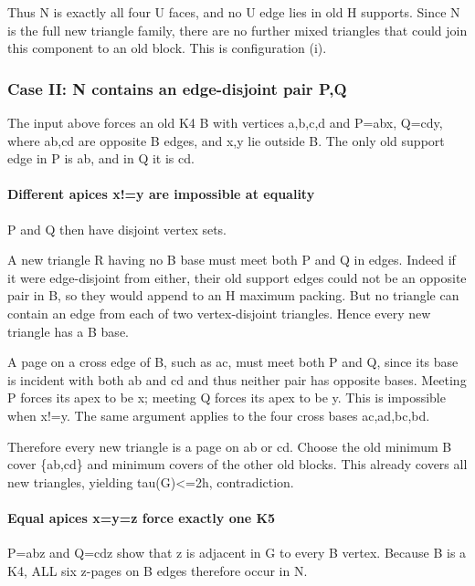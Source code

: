 \documentclass[11pt]{article}
\begin{document}
Thus N is exactly all four U faces, and no U edge lies in old H supports. Since N is the full new triangle family, there are no further mixed triangles that could join this component to an old block. This is configuration (i).

\subsubsection{Case II: N contains an edge-disjoint pair P,Q}\label{case-ii-n-contains-an-edge-disjoint-pair-pq}

The input above forces an old K4 B with vertices a,b,c,d and P=abx, Q=cdy, where ab,cd are opposite B edges, and x,y lie outside B. The only old support edge in P is ab, and in Q it is cd.

\paragraph{Different apices x!=y are impossible at equality}\label{different-apices-xy-are-impossible-at-equality}

P and Q then have disjoint vertex sets.

A new triangle R having no B base must meet both P and Q in edges. Indeed if it were edge-disjoint from either, their old support edges could not be an opposite pair in B, so they would append to an H maximum packing. But no triangle can contain an edge from each of two vertex-disjoint triangles. Hence every new triangle has a B base.

A page on a cross edge of B, such as ac, must meet both P and Q, since its base is incident with both ab and cd and thus neither pair has opposite bases. Meeting P forces its apex to be x; meeting Q forces its apex to be y. This is impossible when x!=y. The same argument applies to the four cross bases ac,ad,bc,bd.

Therefore every new triangle is a page on ab or cd. Choose the old minimum B cover \{ab,cd\} and minimum covers of the other old blocks. This already covers all new triangles, yielding tau(G)\textless=2h, contradiction.

\paragraph{Equal apices x=y=z force exactly one K5}\label{equal-apices-xyz-force-exactly-one-k5}

P=abz and Q=cdz show that z is adjacent in G to every B vertex. Because B is a K4, ALL six z-pages on B edges therefore occur in N.
\end{document}
